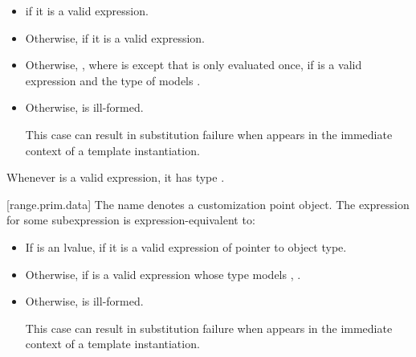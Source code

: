 \begin{itemize}
\item
   if it is a valid expression.

\item
  Otherwise,  if it is a valid expression.

\item
  Otherwise, , where  is
  except that  is only evaluated once,
  if  is a valid expression and
  the type of  models .

\item
  Otherwise,  is ill-formed.
  \begin{note}
  This case can result in substitution failure when 
  appears in the immediate context of a template instantiation.
  \end{note}
\end{itemize}

\pnum
\begin{note}
Whenever  is a valid expression,
it has type .
\end{note}

[range.prim.data]{}
\pnum
The name  denotes a customization point
object. The expression
 for some subexpression  is
expression-equivalent to:

\begin{itemize}
\item
  If  is an lvalue, 
  if it is a valid expression of pointer to object type.

\item
  Otherwise, if  is a valid expression whose type models
  ,
  .

\item
  Otherwise,  is ill-formed.
  \begin{note}
  This case can result in substitution failure when 
  appears in the immediate context of a template instantiation.
  \end{note}
\end{itemize}

